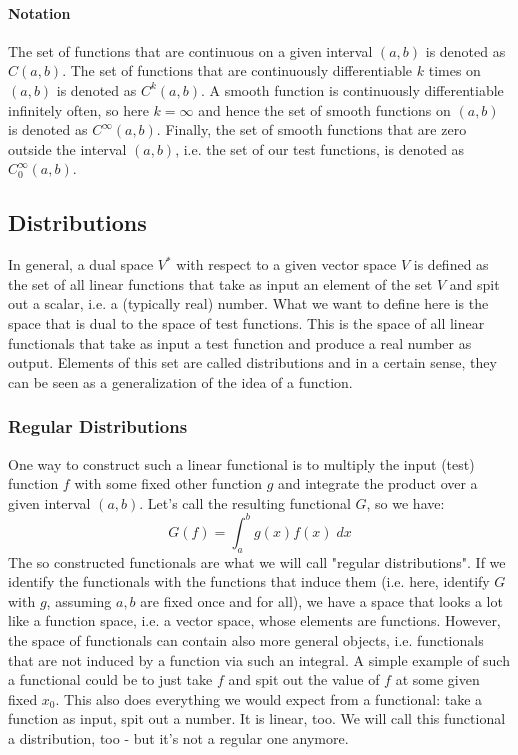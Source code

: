 \paragraph{Notation}
The set of functions that are continuous on a given interval $(a,b)$ is denoted as $C(a,b)$. The set of functions that are continuously differentiable $k$ times on $(a,b)$ is denoted as $C^k(a,b)$. A smooth function is continuously differentiable infinitely often, so here $k = \infty$ and hence the set of smooth functions on $(a,b)$ is denoted as $C^{\infty}(a,b)$. Finally, the set of smooth functions that are zero outside the interval $(a,b)$, i.e. the set of our test functions, is denoted as  $C_0^{\infty}(a,b)$.


\subsection{Distributions}
In general, a dual space $V^*$ with respect to a given vector space $V$ is defined as the set of all linear functions that take as input an element of the set $V$ and spit out a scalar, i.e. a (typically real) number. What we want to define here is the space that is dual to the space of test functions. This is the space of all linear functionals that take as input a test function and produce a real number as output. Elements of this set are called distributions and in a certain sense, they can be seen as a generalization of the idea of a function. 

\subsubsection{Regular Distributions}
One way to construct such a linear functional is to multiply the input (test) function $f$ with some fixed other function $g$ and integrate the product over a given interval $(a,b)$. Let's call the resulting functional $G$, so we have:
\begin{equation}
 G(f) = \int_a^b g(x) f(x) \; dx
\end{equation}
The so constructed functionals are what we will call "regular distributions". If we identify the functionals with the functions that induce them (i.e. here, identify $G$ with $g$, assuming $a,b$ are fixed once and for all), we have a space that looks a lot like a function space, i.e. a vector space, whose elements are functions. However, the space of functionals can contain also more general objects, i.e. functionals that are not induced by a function via such an integral. A simple example of such a functional could be to just take $f$ and spit out the value of $f$ at some given fixed $x_0$. This also does everything we would expect from a functional: take a function as input, spit out a number. It is linear, too. We will call this functional a distribution, too - but it's not a regular one anymore.

